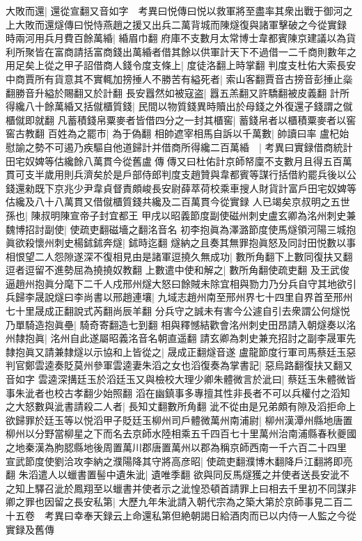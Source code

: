大敗而還|{
	還從宣翻又音如字　考異曰悦傳曰悦以救軍將至盡率其衆出戰于御河之上大敗而還燧傳曰悦恃燕趙之援又出兵二萬背城而陳燧復與諸軍擊破之今從實録}
時兩河用兵月費百餘萬緍|{
	緍眉巾翻}
府庫不支數月太常博士韋都賓陳京建議以為貨利所聚皆在富商請括富商錢出萬緍者借其餘以供軍計天下不過借一二千商則數年之用足矣上從之甲子詔借商人錢令度支條上|{
	度徒洛翻上時掌翻}
判度支杜佑大索長安中商賈所有貨意其不實輒加搒捶人不勝苦有縊死者|{
	索山客翻賈音古搒音彭捶止橤翻勝音升縊於賜翻又於計翻}
長安囂然如被寇盗|{
	囂五羔翻又許驕翻被皮義翻}
計所得纔八十餘萬緍又括僦櫃質錢|{
	民間以物質錢異時贖出於母錢之外復還子錢謂之僦櫃僦即就翻}
凡蓄積錢帛粟麥者皆借四分之一封其櫃窖|{
	蓄錢帛者以櫃積粟麥者以窖窖古教翻}
百姓為之罷市|{
	為于偽翻}
相帥遮宰相馬自訴以千萬數|{
	帥讀曰率}
盧杞始慰諭之勢不可遏乃疾驅自他道歸計并借商所得纔二百萬緍　|{
	考異曰實録借商統計田宅奴婢等估纔餘八萬貫今從舊盧傳傳又曰杜佑計京師帑廩不支數月且得五百萬貫可支半歲用則兵濟矣於是戶部侍郎判度支趙贊與韋都賓等謀行括借約罷兵後以公錢還勑既下京兆少尹韋貞督責頗峻長安尉薛萃荷校乘車搜人財貨計富戶田宅奴婢等估纔及八十八萬貫又借僦櫃質錢共纔及二百萬貫今從實録}
人已竭矣京叔明之五世孫也|{
	陳叔明陳宣帝子封宜都王}
甲戌以昭義節度副使磁州刺史盧玄卿為洺州刺史兼魏博招討副使|{
	使疏吏翻磁墻之翻洺音名}
初李抱眞為澤潞節度使馬燧領河陽三城抱眞欲殺懷州刺史楊鉥鉥奔燧|{
	鉥時迄翻}
燧納之且奏其無罪抱眞怒及同討田悦數以事相恨望二人怨隙遂深不復相見由是諸軍逗撓久無成功|{
	數所角翻下上數同復扶又翻逗者逗留不進勢屈為撓撓奴教翻}
上數遣中使和解之|{
	數所角翻使疏吏翻}
及王武俊逼趙州抱眞分麾下二千人戍邢州燧大怒曰餘賊未除宜相與勠力乃分兵自守其地欲引兵歸李晟說燧曰李尚書以邢趙連壤|{
	九域志趙州南至邢州界七十四里自界首至邢州七十里晟成正翻說式芮翻尚辰羊翻}
分兵守之誠未有害今公遽自引去衆謂公何燧悦乃單騎造抱眞壘|{
	騎奇寄翻造七到翻}
相與釋憾結歡會洺州刺史田昂請入朝燧奏以洺州隸抱眞|{
	洺州自此遂屬昭義洺音名朝直遥翻}
請玄卿為刺史兼充招討之副李晟軍先隸抱眞又請兼隸燧以示協和上皆從之|{
	晟成正翻燧音遂}
盧龍節度行軍司馬蔡廷玉惡判官鄭雲逵奏貶莫州參軍雲逵妻朱滔之女也滔復奏為掌書記|{
	惡烏路翻復扶又翻又音如字}
雲逵深搆廷玉於滔廷玉又與檢校大理少卿朱體微言於泚曰|{
	蔡廷玉朱體微皆事朱泚者也校古孝翻少始照翻}
滔在幽鎮事多專擅其性非長者不可以兵權付之滔知之大怒數與泚書請殺二人者|{
	長知丈翻數所角翻}
泚不從由是兄弟頗有隙及滔拒命上欲歸罪於廷玉等以悦滔甲子貶廷玉柳州司戶體微萬州南浦尉|{
	柳州漢潭州縣地唐置柳州以分野當柳星之下而名去京師水陸相乘五千四百七十里萬州治南浦縣春秋夔國之地秦漢為朐䏰縣地後周置萬川郡唐置萬州以郡為稱京師西南一千六百二十四里}
宣武節度使劉洽攻李納之濮陽降其守將高彦昭|{
	使疏吏翻濮博木翻降戶江翻將即亮翻}
朱滔遣人以蠟書置髻中遺朱泚|{
	遺唯季翻}
欲與同反馬燧獲之并使者送長安泚不之知上驛召泚於鳳翔至以蠟書并使者示之泚惶恐頓首請罪上曰相去千里初不同謀非卿之罪也因留之長安私第|{
	大歷九年朱泚請入朝代宗為之築大第於京師事見二百二十五卷　考異曰幸奉天録云上命還私第但絶朝謁日給酒肉而已以内侍一人監之今從實録及舊傳}
